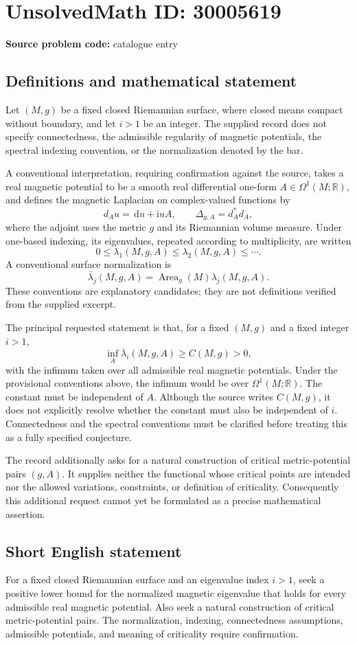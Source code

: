 \documentclass[11pt]{article}
\newcommand{\R}{\mathbb{R}}
\newcommand{\dd}{\,\mathrm{d}}
\begin{document}
\section*{UnsolvedMath ID: 30005619}
\textbf{Source problem code:} catalogue entry
\subsection{Definitions and mathematical statement}
Let \((M,g)\) be a fixed closed Riemannian surface, where closed means compact without boundary, and let \(i>1\) be an integer. The supplied record does not specify connectedness, the admissible regularity of magnetic potentials, the spectral indexing convention, or the normalization denoted by the bar.

A conventional interpretation, requiring confirmation against the source, takes a real magnetic potential to be a smooth real differential one-form \(A\in\Omega^1(M;\R)\), and defines the magnetic Laplacian on complex-valued functions by
\[
 d_Au=\dd u+\mathrm{i}uA,\qquad \Delta_{g,A}=d_A^*d_A,
\]
where the adjoint uses the metric \(g\) and its Riemannian volume measure. Under one-based indexing, its eigenvalues, repeated according to multiplicity, are written
\[
0\leq\lambda_1(M,g,A)\leq\lambda_2(M,g,A)\leq\cdots.
\]
A conventional surface normalization is
\[
\overline\lambda_j(M,g,A)=\operatorname{Area}_g(M)\lambda_j(M,g,A).
\]
These conventions are explanatory candidates; they are not definitions verified from the supplied excerpt.

The principal requested statement is that, for a fixed \((M,g)\) and a fixed integer \(i>1\),
\[
\inf_A\overline\lambda_i(M,g,A)\geq C(M,g)>0,
\]
with the infimum taken over all admissible real magnetic potentials. Under the provisional conventions above, the infimum would be over \(\Omega^1(M;\R)\). The constant must be independent of \(A\). Although the source writes \(C(M,g)\), it does not explicitly resolve whether the constant must also be independent of \(i\). Connectedness and the spectral conventions must be clarified before treating this as a fully specified conjecture.

The record additionally asks for a natural construction of critical metric-potential pairs \((g,A)\). It supplies neither the functional whose critical points are intended nor the allowed variations, constraints, or definition of criticality. Consequently this additional request cannot yet be formulated as a precise mathematical assertion.
\subsection{Short English statement}
For a fixed closed Riemannian surface and an eigenvalue index \(i>1\), seek a positive lower bound for the normalized magnetic eigenvalue that holds for every admissible real magnetic potential. Also seek a natural construction of critical metric-potential pairs. The normalization, indexing, connectedness assumptions, admissible potentials, and meaning of criticality require confirmation.
\end{document}

